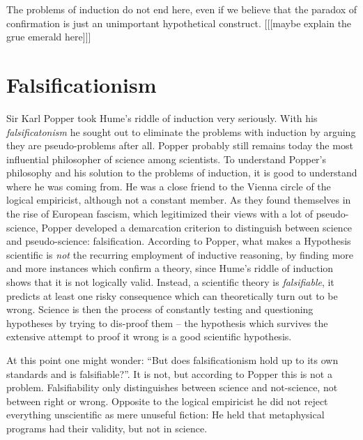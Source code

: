 The problems of induction do not end here, even if we believe that
the paradox of confirmation is just an unimportant hypothetical
construct.
    [[[maybe explain the grue emerald here]]]

\section{Falsificationism}
Sir Karl Popper took Hume's riddle of induction very seriously.
With his \emph{falsificatonism} he sought out to eliminate the
problems with induction by arguing they are pseudo-problems after all.
Popper probably still remains today the most influential philosopher of science
among scientists.
To understand Popper's philosophy and his solution to the problems of induction,
it is good to understand where he was coming from.
He was a close friend to the Vienna circle of the logical empiricist,
although not a constant member.
As they found themselves in the rise of European fascism, which
legitimized their views with a lot of pseudo-science,
Popper developed a demarcation criterion to distinguish
between science and pseudo-science: falsification.
According to Popper, what makes a Hypothesis scientific is \emph{not}
the recurring employment of inductive reasoning, by
finding more and more instances which confirm a theory,
since Hume's riddle of induction shows that it
is not logically valid.
Instead, a scientific theory is \emph{falsifiable},
it predicts at least one risky consequence which
can theoretically turn out to be wrong.
Science is then the process of constantly testing and
questioning hypotheses by trying to dis-proof them
-- the hypothesis which survives the extensive
attempt to proof it wrong is a good scientific hypothesis.

At this point one might wonder:
\enquote{But does falsificationism hold up to its own standards and is falsifiable?}.
It is not, but according to Popper this is not a problem.
Falsifiability only distinguishes between science and not-science, not
between right or wrong.
Opposite to the logical empiricist he did not reject everything
unscientific as mere unuseful fiction:
He held that metaphysical programs had their validity, but not in science.

